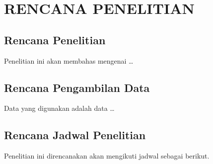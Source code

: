 \chapter{RENCANA PENELITIAN}

\section{Rencana Penelitian}
Penelitian ini akan membahas mengenai \ldots

\section{Rencana Pengambilan Data}
Data yang digunakan adalah data \ldots

\section{Rencana Jadwal Penelitian}
Penelitian ini direncanakan akan mengikuti jadwal sebagai berikut.
\begin{figure}[h!]

\end{figure}